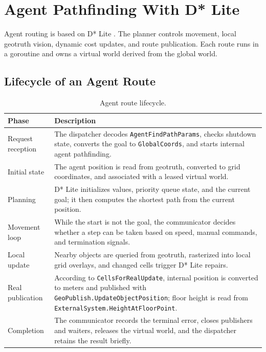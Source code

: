 \documentclass[12pt,a4paper]{report}
\begin{document}
\section{Agent Pathfinding With D* Lite}

Agent routing is based on D* Lite \cite{koenig-likhachev-dstar-lite}. The
planner controls movement, local geotruth vision, dynamic cost updates, and
route publication. Each route runs in a goroutine and owns a virtual world
derived from the global world.

\subsection{Lifecycle of an Agent Route}

\begin{table}[H]
\centering
\begin{tabular}{|p{}|p{}|}
\hline
\textbf{Phase} & \textbf{Description} \\
\hline
Request reception &
The dispatcher decodes \texttt{AgentFindPathParams}, checks shutdown state,
converts the goal to \texttt{GlobalCoords}, and starts internal agent
pathfinding. \\
\hline
Initial state &
The agent position is read from geotruth, converted to grid coordinates, and
associated with a leased virtual world. \\
\hline
Planning &
D* Lite initializes values, priority queue state, and the current goal; it then
computes the shortest path from the current position. \\
\hline
Movement loop &
While the start is not the goal, the communicator decides whether a step can be
taken based on speed, manual commands, and termination signals. \\
\hline
Local update &
Nearby objects are queried from geotruth, rasterized into local grid overlays,
and changed cells trigger D* Lite repairs. \\
\hline
Real publication &
According to \texttt{CellsForRealUpdate}, internal position is converted to
meters and published with \texttt{GeoPublish.UpdateObjectPosition}; floor height
is read from \texttt{ExternalSystem.HeightAtFloorPoint}. \\
\hline
Completion &
The communicator records the terminal error, closes publishers and waiters,
releases the virtual world, and the dispatcher retains the result briefly. \\
\hline
\end{tabular}
\caption{Agent route lifecycle.}
\end{table}
\end{document}
